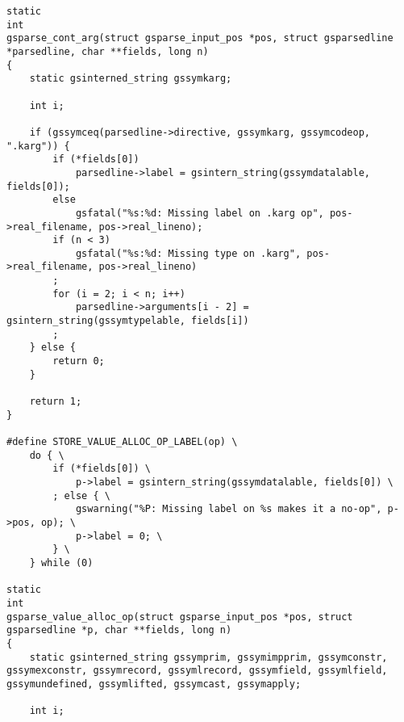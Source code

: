 \documentclass{report}
\begin{document}
\begin{verbatim}
static
int
gsparse_cont_arg(struct gsparse_input_pos *pos, struct gsparsedline *parsedline, char **fields, long n)
{
    static gsinterned_string gssymkarg;

    int i;

    if (gssymceq(parsedline->directive, gssymkarg, gssymcodeop, ".karg")) {
        if (*fields[0])
            parsedline->label = gsintern_string(gssymdatalable, fields[0]);
        else
            gsfatal("%s:%d: Missing label on .karg op", pos->real_filename, pos->real_lineno);
        if (n < 3)
            gsfatal("%s:%d: Missing type on .karg", pos->real_filename, pos->real_lineno)
        ;
        for (i = 2; i < n; i++)
            parsedline->arguments[i - 2] = gsintern_string(gssymtypelable, fields[i])
        ;
    } else {
        return 0;
    }

    return 1;
}

#define STORE_VALUE_ALLOC_OP_LABEL(op) \
    do { \
        if (*fields[0]) \
            p->label = gsintern_string(gssymdatalable, fields[0]) \
        ; else { \
            gswarning("%P: Missing label on %s makes it a no-op", p->pos, op); \
            p->label = 0; \
        } \
    } while (0)

static
int
gsparse_value_alloc_op(struct gsparse_input_pos *pos, struct gsparsedline *p, char **fields, long n)
{
    static gsinterned_string gssymprim, gssymimpprim, gssymconstr, gssymexconstr, gssymrecord, gssymlrecord, gssymfield, gssymlfield, gssymundefined, gssymlifted, gssymcast, gssymapply;

    int i;


\end{verbatim}
\end{document}
